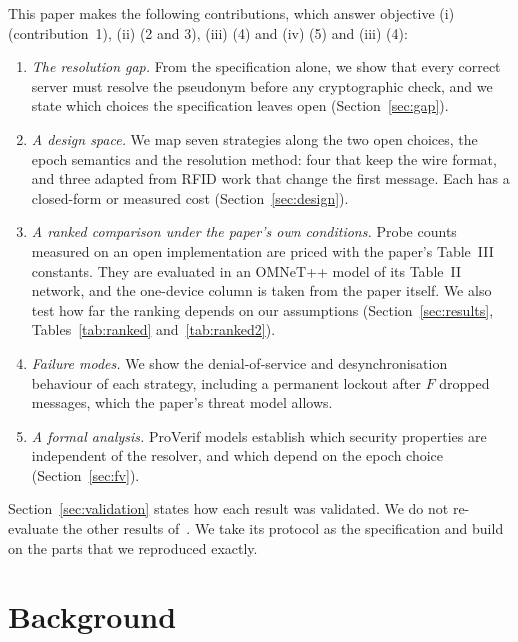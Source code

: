 This paper makes the following contributions, which answer objective (i) (contribution~1), (ii) (2 and 3)\iffv, (iii)
(4) and (iv) (5)\else{} and (iii) (4)\fi:
\begin{enumerate}
\item \emph{The resolution gap.} From the specification alone, we show that every correct server must resolve the
pseudonym before any cryptographic check, and we state which choices the specification leaves open
(Section~\ref{sec:gap}).
\item \emph{A design space.} We map seven strategies along the two open choices, the epoch semantics and the resolution
method: four that keep the wire format, and three adapted from RFID work that change the first message. Each has a
closed-form or measured cost (Section~\ref{sec:design}).
\item \emph{A ranked comparison under the paper's own conditions.} Probe counts measured on an open implementation are
priced with the paper's Table~III constants. They are evaluated in an OMNeT++ model of its Table~II network, and the
one-device column is taken from the paper itself. We also test how far the ranking depends on our assumptions
(Section~\ref{sec:results}, Tables~\ref{tab:ranked} and~\ref{tab:ranked2}).
\item \emph{Failure modes.} We show the denial-of-service and desynchronisation behaviour of each strategy, including a
permanent lockout after $F$ dropped messages, which the paper's threat model allows.
\iffv
\item \emph{A formal analysis.} ProVerif models establish which security properties are independent of the resolver,
and which depend on the epoch choice (Section~\ref{sec:fv}).
\fi
\end{enumerate}
Section~\ref{sec:validation} states how each result was validated. We do not re-evaluate the other results
of~\cite{base}. We take its protocol as the specification and build on the parts that we reproduced exactly.

\section{Background}\label{sec:background}
